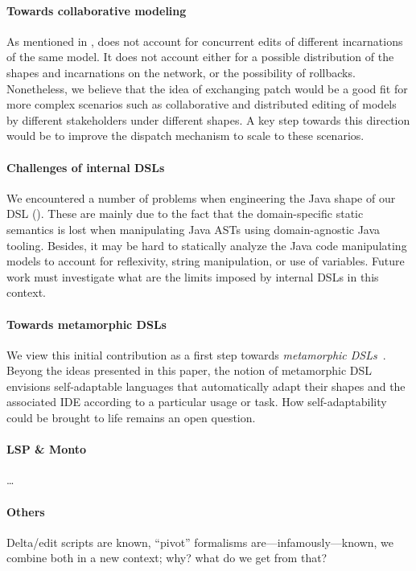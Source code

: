 \paragraph{Towards collaborative modeling}
As mentioned in , \prism does not account for concurrent edits of different incarnations of the same model.
It does not account either for a possible distribution of the shapes and incarnations on the network, or the possibility of rollbacks.
Nonetheless, we believe that the idea of exchanging patch would be a good fit for more complex scenarios such as collaborative and distributed editing of models by different stakeholders under different shapes.
A key step towards this direction would be to improve the dispatch mechanism to scale to these scenarios.

\paragraph{Challenges of internal DSLs}
We encountered a number of problems when engineering the Java shape of our DSL ().
These are mainly due to the fact that the domain-specific static semantics is lost when manipulating Java ASTs using domain-agnostic Java tooling.
Besides, it may be hard to statically analyze the Java code manipulating models to account for reflexivity, string manipulation, or use of variables.
Future work must investigate what are the limits imposed by internal DSLs in this context.


\paragraph{Towards metamorphic DSLs}
We view this initial contribution as a first step towards \emph{metamorphic DSLs}~\cite{acher2014metamorphic}.
Beyong the ideas presented in this paper, the notion of metamorphic DSL envisions self-adaptable languages that automatically adapt their shapes and the associated IDE according to a particular usage or task.
How self-adaptability could be brought to life remains an open question.

\paragraph{LSP \& Monto}
\dots

\paragraph{Others}
Delta/edit scripts are known, ``pivot'' formalisms are---infamously---known, we combine both in a new context; why? what do we get from that?
